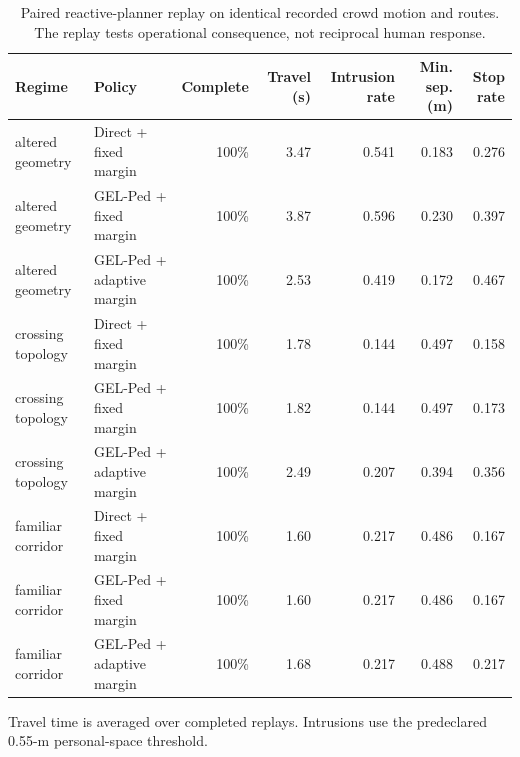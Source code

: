 \begin{table}[!htbp]
\centering
\caption{Paired reactive-planner replay on identical recorded crowd motion and routes. The replay tests operational consequence, not reciprocal human response.}
\label{tab:r3-planner-utility}
\small
\setlength{\tabcolsep}{4.2pt}
\renewcommand{\arraystretch}{1.08}
\begin{tabular}{llrrrrr}
\toprule
Regime & Policy & Complete & Travel (s) & Intrusion rate & Min. sep. (m) & Stop rate \\
\midrule
altered geometry & Direct + fixed margin & 100\% & 3.47 & 0.541 & 0.183 & 0.276 \\
altered geometry & GEL-Ped + fixed margin & 100\% & 3.87 & 0.596 & 0.230 & 0.397 \\
altered geometry & GEL-Ped + adaptive margin & 100\% & 2.53 & 0.419 & 0.172 & 0.467 \\
crossing topology & Direct + fixed margin & 100\% & 1.78 & 0.144 & 0.497 & 0.158 \\
crossing topology & GEL-Ped + fixed margin & 100\% & 1.82 & 0.144 & 0.497 & 0.173 \\
crossing topology & GEL-Ped + adaptive margin & 100\% & 2.49 & 0.207 & 0.394 & 0.356 \\
familiar corridor & Direct + fixed margin & 100\% & 1.60 & 0.217 & 0.486 & 0.167 \\
familiar corridor & GEL-Ped + fixed margin & 100\% & 1.60 & 0.217 & 0.486 & 0.167 \\
familiar corridor & GEL-Ped + adaptive margin & 100\% & 1.68 & 0.217 & 0.488 & 0.217 \\
\bottomrule
\end{tabular}
\par\vspace{2pt}\footnotesize Travel time is averaged over completed replays. Intrusions use the predeclared 0.55-m personal-space threshold.
\end{table}
